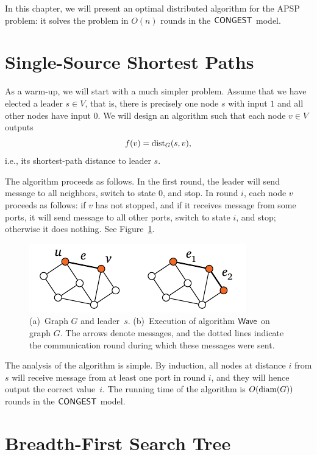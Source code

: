 In this chapter, we will present an optimal distributed algorithm for the APSP problem: it solves the problem in $O(n)$ rounds in the $\textup{\sffamily CONGEST}$ model.

\newcommand{\BFS}{\algo{BFS}}
\newcommand{\Wave}{\algo{Wave}}

\section{Single-Source Shortest Paths}\label{sec:wave}

As a warm-up, we will start with a much simpler problem. Assume that we have elected a leader $s \in V$, that is, there is precisely one node $s$ with input $1$ and all other nodes have input $0$. We will design an algorithm such that each node $v \in V$ outputs
\[
    f(v) = \operatorname{dist}_G(s,v),
\]
i.e., its shortest-path distance to leader $s$.

The algorithm proceeds as follows. In the first round, the leader will send message  to all neighbors, switch to state $0$, and stop. In round $i$, each node $v$ proceeds as follows: if $v$ has not stopped, and if it receives message  from some ports, it will send message  to all other ports, switch to state $i$, and stop; otherwise it does nothing. See Figure~\ref{fig:wave}.

\begin{figure}
    \centering
    \includegraphics[page=\PWave]{figs.pdf}
    \caption{(a)~Graph $G$ and leader~$s$. (b)~Execution of algorithm $\Wave$ on graph $G$. The arrows denote  messages, and the dotted lines indicate the communication round during which these messages were sent.}\label{fig:wave}
\end{figure}

The analysis of the algorithm is simple. By induction, all nodes at distance $i$ from $s$ will receive message  from at least one port in round $i$, and they will hence output the correct value~$i$. The running time of the algorithm is $O(\operatorname{diam}(G))$ rounds in the $\textup{\sffamily CONGEST}$ model.


\section{Breadth-First Search Tree}\label{sec:bfs}

